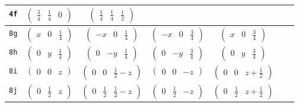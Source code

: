 \documentclass[fleqn,9pt,landscape]{jsarticle}
\begin{document}
\begin{center}
\begin{longtable}{ccccccc}
{\tt 4f} & $ \begin{pmatrix} \frac{3}{4} & \frac{1}{4} & 0 \end{pmatrix} $ & $ \begin{pmatrix} \frac{1}{4} & \frac{1}{4} & \frac{1}{2} \end{pmatrix} $ & $  $ & $  $ & $  $ & $  $ \\ \hline
{\tt 8g} & $ \begin{pmatrix} x & 0 & \frac{1}{4} \end{pmatrix} $ & $ \begin{pmatrix} - x & 0 & \frac{1}{4} \end{pmatrix} $ & $ \begin{pmatrix} - x & 0 & \frac{3}{4} \end{pmatrix} $ & $ \begin{pmatrix} x & 0 & \frac{3}{4} \end{pmatrix} $ & $  $ & $  $ \\ \hline
{\tt 8h} & $ \begin{pmatrix} 0 & y & \frac{1}{4} \end{pmatrix} $ & $ \begin{pmatrix} 0 & - y & \frac{1}{4} \end{pmatrix} $ & $ \begin{pmatrix} 0 & - y & \frac{3}{4} \end{pmatrix} $ & $ \begin{pmatrix} 0 & y & \frac{3}{4} \end{pmatrix} $ & $  $ & $  $ \\ \hline
{\tt 8i} & $ \begin{pmatrix} 0 & 0 & z \end{pmatrix} $ & $ \begin{pmatrix} 0 & 0 & \frac{1}{2} - z \end{pmatrix} $ & $ \begin{pmatrix} 0 & 0 & - z \end{pmatrix} $ & $ \begin{pmatrix} 0 & 0 & z + \frac{1}{2} \end{pmatrix} $ & $  $ & $  $ \\ \hline
{\tt 8j} & $ \begin{pmatrix} 0 & \frac{1}{2} & z \end{pmatrix} $ & $ \begin{pmatrix} 0 & \frac{1}{2} & \frac{1}{2} - z \end{pmatrix} $ & $ \begin{pmatrix} 0 & \frac{1}{2} & - z \end{pmatrix} $ & $ \begin{pmatrix} 0 & \frac{1}{2} & z + \frac{1}{2} \end{pmatrix} $ & $  $ & $  $ \\ \hline

\end{longtable}
\end{center}
\end{document}

